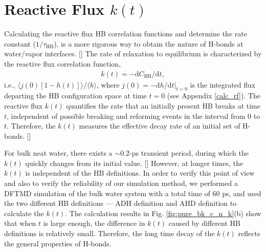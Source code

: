 
\section{Reactive Flux $k(t)$} 
Calculating the reactive flux HB correlation functions and determine the rate constant ($1/\tau_{\text{HB}}$),
is a more rigorous way to obtain the nature of H-bonds at water/vapor interfaces. [\cite{AL00}]
The rate of relaxation to equilibrium is characterized by the reactive flux correlation function, 
\begin{eqnarray}
k(t) = -\text{d}C_{\text{HB}}/\text{d}t,
\label{eq:k}
\end{eqnarray}
i.e., $\langle j(0)[1-h(t)]\rangle/\langle h\rangle$,
where 
$j(0)=-\text{d}h/\text{d}t|_{t=0}$ 
is the integrated flux departing the HB configuration space at time $t=0$ (see Appendix \ref{calc_rf}).
The reactive flux $k(t)$ quantifies the rate that an initially present HB breaks at time $t$, 
independent of possible breaking and reforming events in the interval from 0 to $t$.
Therefore, the $k(t)$ measures the effective decay rate of an 
initial set of H-bonds. [\cite{DC87,FWS00}]

For bulk neat water, there exists a $\sim 0.2$-ps transient period,
during which the $k(t)$ quickly changes from its initial value. [\cite{FWS00}]
However, at longer times, the $k(t)$ is independent of the HB definitions.
In order to verify this point of view and also to verify the reliability of our simulation method, 
we performed a DFTMD simulation of the bulk water system with a total time of 60 ps, 
and used the two different HB definitions --- ADH definition and AHD definition to calculate the $k(t)$. 
The calculation results in Fig. \ref{fig:pure_bk_c_n_k}(b) show that when $t$ is large enough, 
the difference in $k(t)$ caused by different HB definitions is relatively small.
Therefore, the long time decay of the $k(t)$ reflects the general properties of H-bonds.


